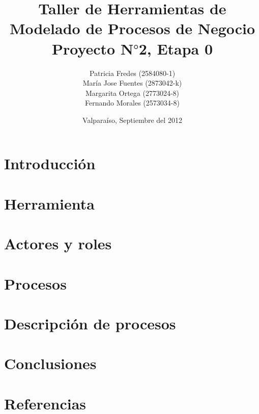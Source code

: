 \documentclass[10pt,letterpaper]{article}
\title{Taller de Herramientas de Modelado de Procesos de Negocio \\ Proyecto N$°$2, Etapa 0}
\author{Patricia Fredes (2584080-1) \\ María Jose Fuentes (2873042-k) \\ Margarita Ortega (2773024-8) \\ Fernando Morales (2573034-8)}
\date{\vspace*{1cm} Valparaí­so, Septiembre del 2012}
\begin{document}
\maketitle
\thispagestyle{empty}
\newpage
\tableofcontents

\makeatother

\newpage

\section{Introducción}


\section{Herramienta}


\section{Actores y roles}


\section{Procesos}


\section{Descripción de procesos}


\section{Conclusiones}





\section{Referencias}
 
\end{document}

